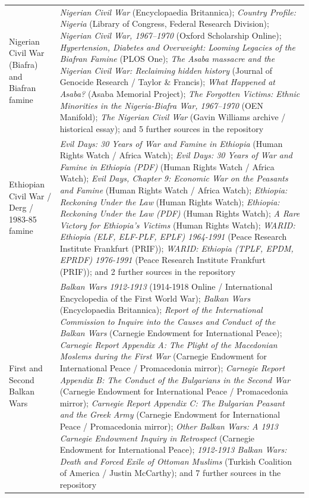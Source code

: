 \documentclass[11pt]{article}
\begin{document}
\begin{scriptsize}
\begin{longtable}{p{3.5cm} p{12.5cm}}
\addlinespace
Nigerian Civil War (Biafra) and Biafran famine & \emph{Nigerian Civil War} (Encyclopaedia Britannica); \emph{Country Profile: Nigeria} (Library of Congress, Federal Research Division); \emph{Nigerian Civil War, 1967–1970} (Oxford Scholarship Online); \emph{Hypertension, Diabetes and Overweight: Looming Legacies of the Biafran Famine} (PLOS One); \emph{The Asaba massacre and the Nigerian Civil War: Reclaiming hidden history} (Journal of Genocide Research / Taylor \& Francis); \emph{What Happened at Asaba?} (Asaba Memorial Project); \emph{The Forgotten Victims: Ethnic Minorities in the Nigeria-Biafra War, 1967–1970} (OEN Manifold); \emph{The Nigerian Civil War} (Gavin Williams archive / historical essay); and 5 further sources in the repository \\
\addlinespace
Ethiopian Civil War / Derg / 1983-85 famine & \emph{Evil Days: 30 Years of War and Famine in Ethiopia} (Human Rights Watch / Africa Watch); \emph{Evil Days: 30 Years of War and Famine in Ethiopia (PDF)} (Human Rights Watch / Africa Watch); \emph{Evil Days, Chapter 9: Economic War on the Peasants and Famine} (Human Rights Watch / Africa Watch); \emph{Ethiopia: Reckoning Under the Law} (Human Rights Watch); \emph{Ethiopia: Reckoning Under the Law (PDF)} (Human Rights Watch); \emph{A Rare Victory for Ethiopia's Victims} (Human Rights Watch); \emph{WARID: Ethiopia (ELF, ELF-PLF, EPLF) 1964-1991} (Peace Research Institute Frankfurt (PRIF)); \emph{WARID: Ethiopia (TPLF, EPDM, EPRDF) 1976-1991} (Peace Research Institute Frankfurt (PRIF)); and 2 further sources in the repository \\
\addlinespace
First and Second Balkan Wars & \emph{Balkan Wars 1912-1913} (1914-1918 Online / International Encyclopedia of the First World War); \emph{Balkan Wars} (Encyclopaedia Britannica); \emph{Report of the International Commission to Inquire into the Causes and Conduct of the Balkan Wars} (Carnegie Endowment for International Peace); \emph{Carnegie Report Appendix A: The Plight of the Macedonian Moslems during the First War} (Carnegie Endowment for International Peace / Promacedonia mirror); \emph{Carnegie Report Appendix B: The Conduct of the Bulgarians in the Second War} (Carnegie Endowment for International Peace / Promacedonia mirror); \emph{Carnegie Report Appendix C: The Bulgarian Peasant and the Greek Army} (Carnegie Endowment for International Peace / Promacedonia mirror); \emph{Other Balkan Wars: A 1913 Carnegie Endowment Inquiry in Retrospect} (Carnegie Endowment for International Peace); \emph{1912-1913 Balkan Wars: Death and Forced Exile of Ottoman Muslims} (Turkish Coalition of America / Justin McCarthy); and 7 further sources in the repository \\

\end{longtable}
\end{scriptsize}
\end{document}
